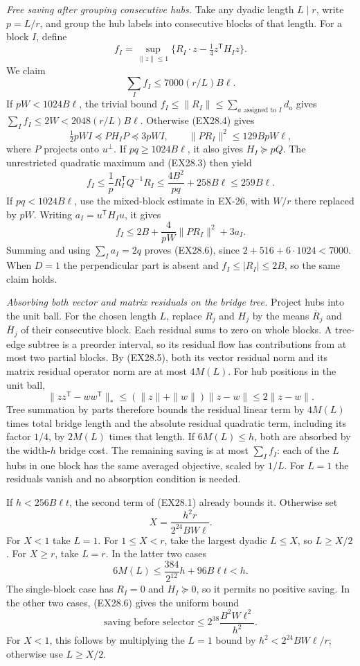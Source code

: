 \emph{Free saving after grouping consecutive hubs.}
Take any dyadic length $L\mid r$, write $p=L/r$, and group the
hub labels into consecutive blocks of that length. For a block
$I$, define
\[
 f_I=\sup_{\|z\|\le1}
       \{R_I\cdot z-\tfrac14z^{\mathsf T}H_Iz\}.
\]
We claim
\[
 \sum_I f_I\le7000(r/L)B\ell.
 \tag{EX28.6}
\]
If $pW<1024B\ell$, the trivial bound
$f_I\le\|R_I\|\le\sum_{a\text{ assigned to }I}d_a$
gives $\sum_If_I\le2W<2048(r/L)B\ell$.
Otherwise (EX28.4) gives
\[
 \tfrac12pWI\preceq PH_IP\preceq3pWI,
 \qquad \|PR_I\|^2\le129BpW\ell,
\]
where $P$ projects onto $u^\perp$.
If $pq\ge1024B\ell$, it also gives $H_I\succeq pQ$.
The unrestricted quadratic maximum and (EX28.3) then yield
\[
 f_I\le\frac1pR_I^{\mathsf T}Q^{-1}R_I
 \le\frac{4B^2}{pq}+258B\ell\le259B\ell.
\]
If $pq<1024B\ell$, use the mixed-block estimate in EX-26,
with $W/r$ there replaced by $pW$. Writing
$a_I=u^{\mathsf T}H_Iu$, it gives
\[
 f_I\le2B+\frac4{pW}\|PR_I\|^2+3a_I.
\]
Summing and using $\sum_Ia_I=2q$ proves (EX28.6), since
$2+516+6\cdot1024<7000$.
When $D=1$ the perpendicular part is absent and
$f_I\le|R_I|\le2B$, so the same claim holds.

\emph{Absorbing both vector and matrix residuals on the bridge tree.}
Project hubs into the unit ball. For the chosen length $L$,
replace $R_j$ and $H_j$ by the means $\overline R_j$ and
$\overline H_j$ of their consecutive block. Each residual
sums to zero on whole blocks. A tree-edge subtree is a preorder
interval, so its residual flow has contributions from at most
two partial blocks. By (EX28.5), both its vector residual norm
and its matrix residual operator norm are at most $4M(L)$.
For hub positions in the unit ball,
\[
 \bigl\|zz^{\mathsf T}-ww^{\mathsf T}\bigr\|_*
 \le(\|z\|+\|w\|)\|z-w\|\le2\|z-w\|.
\]
Tree summation by parts therefore bounds the residual linear
term by $4M(L)$ times total bridge length and the absolute
residual quadratic term, including its factor $1/4$, by
$2M(L)$ times that length. If $6M(L)\le h$, both are
absorbed by the width-$h$ bridge cost. The remaining saving
is at most $\sum_I f_I$: each of the $L$ hubs in one block
has the same averaged objective, scaled by $1/L$.
For $L=1$ the residuals vanish and no absorption condition is
needed.

If $h<256B\ell t$, the second term of (EX28.1) already
bounds it. Otherwise set
\[
 X=\frac{h^2r}{2^{24}BW\ell}.
\]
For $X<1$ take $L=1$. For $1\le X<r$, take the largest
dyadic $L\le X$, so $L\ge X/2$.
For $X\ge r$, take $L=r$. In the latter two cases
\[
 6M(L)\le\frac{384}{2^{12}}h+96B\ell t<h.
\]
The single-block case has $R_I=0$ and $H_I\succeq0$,
so it permits no positive saving. In the other two cases,
(EX28.6) gives the uniform bound
\[
 \text{saving before selector}
 \le2^{38}\frac{B^2W\ell^2}{h^2}.
 \tag{EX28.7}
\]
For $X<1$, this follows by multiplying the $L=1$ bound by
$h^2<2^{24}BW\ell/r$; otherwise use $L\ge X/2$.

